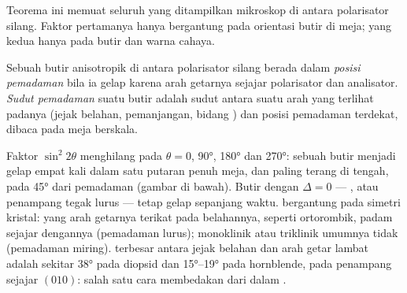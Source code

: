 Teorema ini memuat seluruh yang ditampilkan mikroskop di antara polarisator silang. Faktor pertamanya hanya bergantung pada orientasi butir di meja; yang kedua hanya pada  butir dan warna cahaya.

\begin{definition}\label{def:b1:optical-mineralogy:extinction}
Sebuah butir anisotropik di antara polarisator silang berada dalam \emph{posisi pemadaman} bila ia gelap karena arah getarnya sejajar polarisator dan analisator. \emph{Sudut pemadaman} suatu butir adalah sudut antara suatu arah yang terlihat padanya (jejak belahan, pemanjangan, bidang ) dan posisi pemadaman terdekat, dibaca pada meja berskala.
\end{definition}

Faktor $\sin^2 2\theta$ menghilang pada $\theta = 0$, \ang{90}, \ang{180} dan \ang{270}: sebuah butir menjadi gelap empat kali dalam satu putaran penuh meja, dan paling terang di tengah, pada \ang{45} dari pemadaman (gambar di bawah). Butir dengan $\Delta = 0$ --- , atau penampang tegak lurus  --- tetap gelap sepanjang waktu.  bergantung pada simetri kristal:  yang arah getarnya terikat pada belahannya, seperti  ortorombik, padam sejajar dengannya (pemadaman lurus);  monoklinik atau triklinik umumnya tidak (pemadaman miring).  terbesar antara jejak belahan dan arah getar lambat adalah sekitar \ang{38} pada diopsid dan \ang{15}--\ang{19} pada hornblende, pada penampang sejajar $(010)$: salah satu cara membedakan  dari  dalam .

